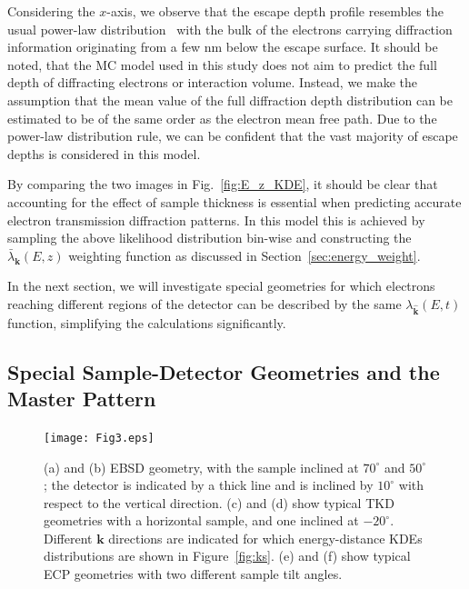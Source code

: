 Considering the $x$-axis, we observe that the escape depth profile resembles the usual power-law distribution~\cite{winkelmann2016} with the bulk of the electrons carrying diffraction information originating from a few nm below the escape surface. It should be noted, that the MC model used in this study does not aim to predict the full depth of diffracting electrons or interaction volume. Instead, we make the assumption that the mean value of the full diffraction depth distribution can be estimated to be of the same order as the electron mean free path. Due to the power-law distribution rule, we can be confident that the vast majority of escape depths is considered in this model.

By comparing the two images in Fig.~\ref{fig:E_z_KDE}, it should be clear that accounting for the effect of sample thickness is essential when predicting accurate electron transmission diffraction patterns. In this model this is achieved by sampling the above likelihood distribution bin-wise and constructing the $\bar{\lambda}_{\mathbf{k}}(E,z)$ weighting function as discussed in Section~\ref{sec:energy_weight}.

In the next section, we will investigate special geometries for which electrons reaching different regions of the detector can be described by the same $\lambda_{\hat{\mathbf{k}}}(E,t)$ function, simplifying the calculations significantly. 



%
\subsection{Special Sample-Detector Geometries and the Master Pattern}
\label{sec:geom}


\begin{figure}[t]
\centering\leavevmode
\texttt{[image: Fig3.eps]}%
\caption[EBSD, TKD and ECP setup geometries]{(a) and (b) EBSD geometry, with the sample inclined at $70^{\circ}$ and $50^{\circ}$; the detector is indicated by a thick line and is inclined by $10^{\circ}$ with respect to the vertical direction. (c) and (d) show typical TKD geometries with a horizontal sample, and one inclined at $-20^{\circ}$.  Different $\mathbf{k}$ directions are indicated for which energy-distance KDEs distributions are shown in Figure~\ref{fig:ks}. (e) and (f) show typical ECP geometries with two different sample tilt angles.}
\label{fig:geometries}
\end{figure}


